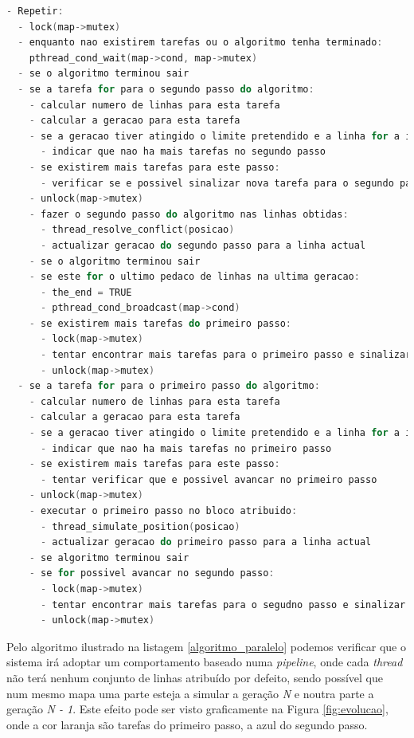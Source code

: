 \documentclass[12pt]{article}
\begin{document}
\begin{lstlisting}[language=c,basicstyle=\footnotesize,frame=single,caption={Algoritmo paralelo.},label=algoritmo_paralelo]
- Repetir:
  - lock(map->mutex)
  - enquanto nao existirem tarefas ou o algoritmo tenha terminado:
    pthread_cond_wait(map->cond, map->mutex)
  - se o algoritmo terminou sair
  - se a tarefa for para o segundo passo do algoritmo:
    - calcular numero de linhas para esta tarefa
    - calcular a geracao para esta tarefa
    - se a geracao tiver atingido o limite pretendido e a linha for a inicial:
      - indicar que nao ha mais tarefas no segundo passo
    - se existirem mais tarefas para este passo:
      - verificar se e possivel sinalizar nova tarefa para o segundo passo do algoritmo
    - unlock(map->mutex)
    - fazer o segundo passo do algoritmo nas linhas obtidas:
      - thread_resolve_conflict(posicao)
      - actualizar geracao do segundo passo para a linha actual
    - se o algoritmo terminou sair
    - se este for o ultimo pedaco de linhas na ultima geracao:
      - the_end = TRUE
      - pthread_cond_broadcast(map->cond)
    - se existirem mais tarefas do primeiro passo:
      - lock(map->mutex)
      - tentar encontrar mais tarefas para o primeiro passo e sinalizar
      - unlock(map->mutex)
  - se a tarefa for para o primeiro passo do algoritmo:
    - calcular numero de linhas para esta tarefa
    - calcular a geracao para esta tarefa
    - se a geracao tiver atingido o limite pretendido e a linha for a inicial:
      - indicar que nao ha mais tarefas no primeiro passo
    - se existirem mais tarefas para este passo:
      - tentar verificar que e possivel avancar no primeiro passo
    - unlock(map->mutex)
    - executar o primeiro passo no bloco atribuido:
      - thread_simulate_position(posicao)
      - actualizar geracao do primeiro passo para a linha actual
    - se algoritmo terminou sair
    - se for possivel avancar no segundo passo:
      - lock(map->mutex)
      - tentar encontrar mais tarefas para o segudno passo e sinalizar
      - unlock(map->mutex)
\end{lstlisting}

Pelo algoritmo ilustrado na listagem \ref{algoritmo_paralelo} podemos verificar que o sistema
irá adoptar um comportamento baseado numa \textit{pipeline}, onde cada \textit{thread} não terá
nenhum conjunto de linhas atribuído por defeito, sendo possível que num mesmo mapa uma parte esteja
a simular a geração \textit{N} e noutra parte a geração \textit{N - 1}.
Este efeito pode ser visto graficamente na Figura \ref{fig:evolucao}, onde a cor laranja
são tarefas do primeiro passo, a azul do segundo passo.
\end{document}
